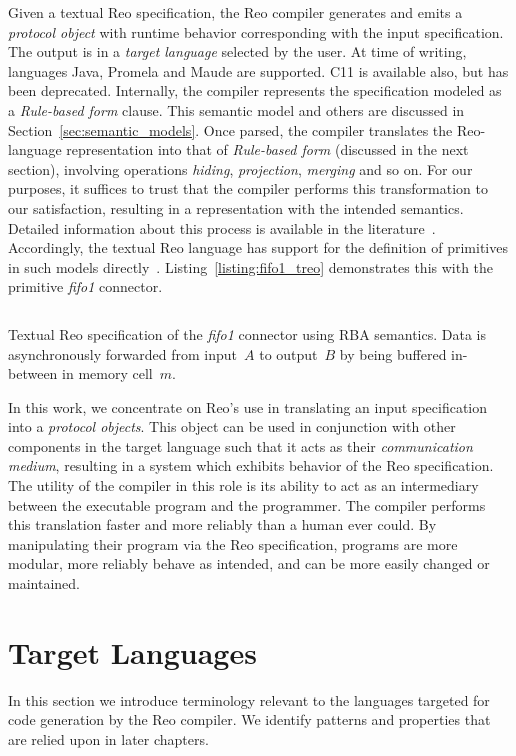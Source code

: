 Given a textual Reo specification, the Reo compiler generates and emits a \textit{protocol object} with runtime behavior corresponding with the input specification. The output is in a \textit{target language} selected by the user. At time of writing, languages Java, Promela and Maude are supported. C11 is available also, but has been deprecated. Internally, the compiler represents the specification modeled as a \textit{Rule-based form} clause. This semantic model and others are discussed in Section~\ref{sec:semantic_models}. Once parsed, the compiler translates the Reo-language representation into that of \textit{Rule-based form} (discussed in the next section), involving operations \textit{hiding}, \textit{projection}, \textit{merging} and so on. For our purposes, it suffices to trust that the compiler performs this transformation to our satisfaction, resulting in a representation with the intended semantics. Detailed information about this process is available in the literature~\cite{arbab2004reo, arbab2005abstract, dokter2018rule}. Accordingly, the textual Reo language has support for the definition of primitives in such models directly~\cite{dokter2018treo}. Listing~\ref{listing:fifo1_treo} demonstrates this with the primitive \textit{fifo1} connector. 


\begin{listing}[ht]
	\inputminted[]{text}{fifo1.rba.treo}
	\caption[Fifo1 connector specfication in textual Reo language.]{Textual Reo specification of the \textit{fifo1} connector using RBA semantics. Data is asynchronously forwarded from input~$A$ to output~$B$ by being buffered in-between in memory cell~$m$.}
	\label{listing:fifo1_treo}
\end{listing}

In this work, we concentrate on Reo's use in translating an input specification into a \textit{protocol objects}. This object can be used in conjunction with other components in the target language such that it acts as their \textit{communication medium}, resulting in a system which exhibits behavior of the Reo specification. The utility of the compiler in this role is its ability to act as an intermediary between the executable program and the programmer. The compiler performs this translation faster and more reliably than a human ever could. By manipulating their program via the Reo specification, programs are more modular, more reliably behave as intended, and can be more easily changed or maintained.


\section{Target Languages}
In this section we introduce terminology relevant to the languages targeted for code generation by the Reo compiler. We identify patterns and properties that are relied upon in later chapters.

